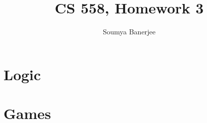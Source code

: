 \documentclass[12pt]{article}
\title{CS 558, Homework 3}
\author{Soumya Banerjee}
\begin{document}
\maketitle

\clearpage
\newpage 

\section{Logic}

\section{Games}



	
\end{document}
